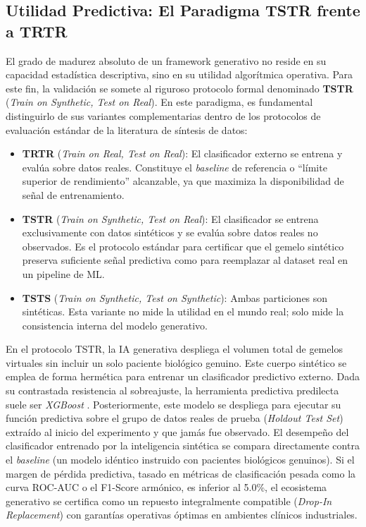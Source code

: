 \subsection{Utilidad Predictiva: El Paradigma TSTR frente a TRTR}

El grado de madurez absoluto de un framework generativo no reside en su capacidad estadística descriptiva, sino en su utilidad algorítmica operativa. Para este fin, la validación se somete al riguroso protocolo formal denominado \textbf{TSTR} (\textit{Train on Synthetic, Test on Real}). En este paradigma, es fundamental distinguirlo de sus variantes complementarias dentro de los protocolos de evaluación estándar de la literatura de síntesis de datos:

\begin{itemize}
    \item \textbf{TRTR} (\textit{Train on Real, Test on Real}): El clasificador externo se entrena y evalúa sobre datos reales. Constituye el \textit{baseline} de referencia o ``límite superior de rendimiento'' alcanzable, ya que maximiza la disponibilidad de señal de entrenamiento.
    \item \textbf{TSTR} (\textit{Train on Synthetic, Test on Real}): El clasificador se entrena exclusivamente con datos sintéticos y se evalúa sobre datos reales no observados. Es el protocolo estándar para certificar que el gemelo sintético preserva suficiente señal predictiva como para reemplazar al dataset real en un pipeline de ML.
    \item \textbf{TSTS} (\textit{Train on Synthetic, Test on Synthetic}): Ambas particiones son sintéticas. Esta variante no mide la utilidad en el mundo real; solo mide la consistencia interna del modelo generativo.
\end{itemize}

En el protocolo TSTR, la IA generativa despliega el volumen total de gemelos virtuales sin incluir un solo paciente biológico genuino. Este cuerpo sintético se emplea de forma hermética para entrenar un clasificador predictivo externo. Dada su contrastada resistencia al sobreajuste, la herramienta predictiva predilecta suele ser \textit{XGBoost} \parencite{chen2016xgboost}. Posteriormente, este modelo se despliega para ejecutar su función predictiva sobre el grupo de datos reales de prueba (\textit{Holdout Test Set}) extraído al inicio del experimento y que jamás fue observado. El desempeño del clasificador entrenado por la inteligencia sintética se compara directamente contra el \textit{baseline} (un modelo idéntico instruido con pacientes biológicos genuinos). Si el margen de pérdida predictiva, tasado en métricas de clasificación pesada como la curva ROC-AUC o el F1-Score armónico, es inferior al 5.0\%, el ecosistema generativo se certifica como un repuesto integralmente compatible (\textit{Drop-In Replacement}) con garantías operativas óptimas en ambientes clínicos industriales.

